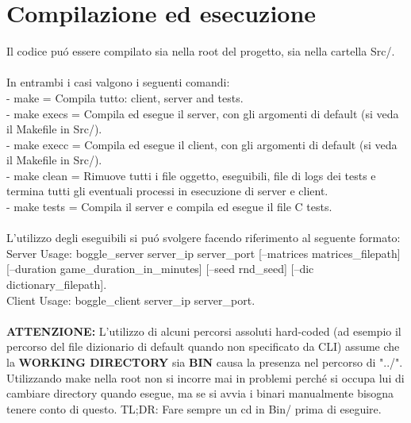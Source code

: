 \chapter{Compilazione ed esecuzione}{\label{ch:compilazioneedesecuzione}}
Il codice pu\'o essere compilato sia nella root del progetto, sia nella cartella Src/.
\\
\\
In entrambi i casi valgono i seguenti comandi:
\\
- make = Compila tutto: client, server and tests.
\\
- make execs = Compila ed esegue il server, con gli argomenti di default (si veda il Makefile in Src/).
\\
- make execc = Compila ed esegue il client, con gli argomenti di default (si veda il Makefile in Src/).
\\
- make clean = Rimuove tutti i file oggetto, eseguibili, file di logs dei tests e termina tutti gli eventuali processi in esecuzione di server e client.
\\
- make tests = Compila il server e compila ed esegue il file C tests.
\\
\\
L'utilizzo degli eseguibili si pu\'o svolgere facendo riferimento al seguente formato:
\\
Server Usage: boggle\_server server\_ip server\_port [--matrices matrices\_filepath] [--duration game\_duration\_in\_minutes] [--seed rnd\_seed] [--dic dictionary\_filepath].
\\
Client Usage: boggle\_client server\_ip server\_port.
\\
\\
\textbf{ATTENZIONE:} L'utilizzo di alcuni percorsi assoluti hard-coded (ad esempio il percorso del file dizionario di default quando non specificato da CLI) assume che la \textbf{WORKING DIRECTORY} sia  \textbf{BIN} causa la presenza nel percorso di "../". Utilizzando make nella root non si incorre mai in problemi perch\'e si occupa lui di cambiare directory quando esegue, ma se si avvia i binari manualmente bisogna tenere conto di questo. TL;DR: Fare sempre un cd in Bin/ prima di eseguire.


